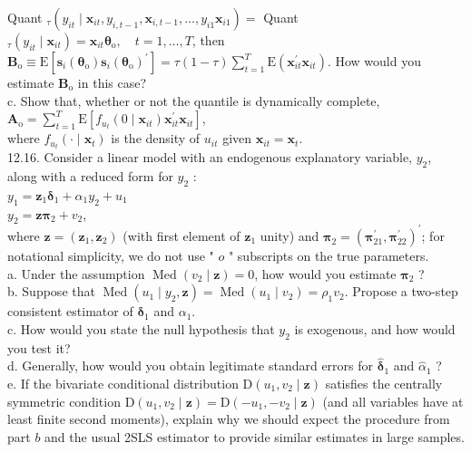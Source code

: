 \documentclass[10pt]{article}
\begin{document}
Quant $_{\tau}\left(y_{i t} \mid \mathbf{x}_{i t}, y_{i, t-1}, \mathbf{x}_{i, t-1}, \ldots, y_{i 1} \mathbf{x}_{i 1}\right)=$ Quant $_{\tau}\left(y_{i t} \mid \mathbf{x}_{i t}\right)=\mathbf{x}_{i t} \boldsymbol{\theta}_{\mathrm{o}}, \quad t=1, \ldots, T$, then $\mathbf{B}_{\mathrm{o}} \equiv \mathrm{E}\left[\mathbf{s}_{i}\left(\boldsymbol{\theta}_{\mathrm{o}}\right) \mathbf{s}_{i}\left(\boldsymbol{\theta}_{\mathrm{o}}\right)^{\prime}\right]=\tau(1-\tau) \sum_{t=1}^{T} \mathrm{E}\left(\mathbf{x}_{i t}^{\prime} \mathbf{x}_{i t}\right)$. How would you estimate $\mathbf{B}_{\mathrm{o}}$ in this case?\\
c. Show that, whether or not the quantile is dynamically complete,\\
$\mathbf{A}_{\mathrm{o}}=\sum_{t=1}^{T} \mathrm{E}\left[f_{u_{t}}\left(0 \mid \mathbf{x}_{i t}\right) \mathbf{x}_{i t}^{\prime} \mathbf{x}_{i t}\right]$,\\
where $f_{u_{t}}\left(\cdot \mid \mathbf{x}_{t}\right)$ is the density of $u_{i t}$ given $\mathbf{x}_{i t}=\mathbf{x}_{t}$.\\
12.16. Consider a linear model with an endogenous explanatory variable, $y_{2}$, along with a reduced form for $y_{2}$ :\\
$y_{1}=\mathbf{z}_{1} \boldsymbol{\delta}_{1}+\alpha_{1} y_{2}+u_{1}$\\
$y_{2}=\mathbf{z} \boldsymbol{\pi}_{2}+v_{2}$,\\
where $\mathbf{z}=\left(\mathbf{z}_{1}, \mathbf{z}_{2}\right)$ (with first element of $\mathbf{z}_{1}$ unity) and $\boldsymbol{\pi}_{2}=\left(\boldsymbol{\pi}_{21}^{\prime}, \boldsymbol{\pi}_{22}^{\prime}\right)^{\prime}$; for notational simplicity, we do not use " $o$ " subscripts on the true parameters.\\
a. Under the assumption $\operatorname{Med}\left(v_{2} \mid \mathbf{z}\right)=0$, how would you estimate $\boldsymbol{\pi}_{2}$ ?\\
b. Suppose that $\operatorname{Med}\left(u_{1} \mid y_{2}, \mathbf{z}\right)=\operatorname{Med}\left(u_{1} \mid v_{2}\right)=\rho_{1} v_{2}$. Propose a two-step consistent estimator of $\boldsymbol{\delta}_{1}$ and $\alpha_{1}$.\\
c. How would you state the null hypothesis that $y_{2}$ is exogenous, and how would you test it?\\
d. Generally, how would you obtain legitimate standard errors for $\hat{\boldsymbol{\delta}}_{1}$ and $\hat{\alpha}_{1}$ ?\\
e. If the bivariate conditional distribution $\mathrm{D}\left(u_{1}, v_{2} \mid \mathbf{z}\right)$ satisfies the centrally symmetric condition $\mathrm{D}\left(u_{1}, v_{2} \mid \mathbf{z}\right)=\mathrm{D}\left(-u_{1},-v_{2} \mid \mathbf{z}\right)$ (and all variables have at least finite second moments), explain why we should expect the procedure from part $b$ and the usual 2SLS estimator to provide similar estimates in large samples.\\
\end{document}
